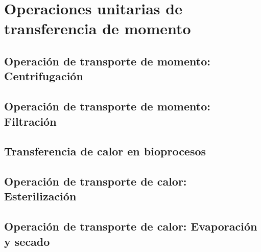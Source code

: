 \documentclass{AsignaturaResumen}
\begin{document}
    \frontmatter

\Portada
\Indices


    \mainmatter


%

\part{Operaciones unitarias de transferencia de momento}

    \chapter{Operación de transporte de momento: Centrifugación} 
    \chapter{Operación de transporte de momento: Filtración} 

%
    \chapter{Transferencia de calor en bioprocesos} 
    \chapter{Operación de transporte de calor: Esterilización} 
    \chapter{Operación de transporte de calor: Evaporación y secado} 

%


    \PlainGeom
    \appendix



    \backmatter

\Respuestas
\Bibliografia
\Glosarios
\end{document}
